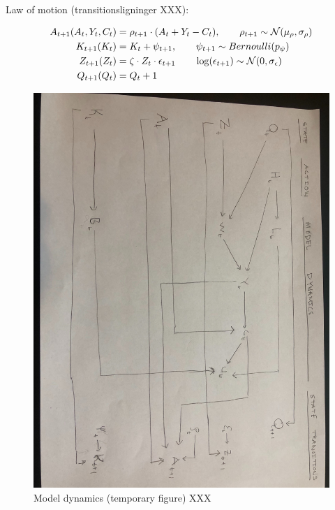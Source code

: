 Law of motion (transitionsligninger XXX):

\begin{align}
    A_{t+1}(A_t, Y_t, C_t) &= \rho_{t+1} \cdot (A_t + Y_t - C_t), \qquad \rho_{t+1} \sim \mathcal{N}(\mu_{\rho}, \sigma_{\rho}) \label{eq:assets_v1} \\
    K_{t+1} (K_t) &= K_t + \psi_{t+1}, \qquad \psi_{t+1} \sim Bernoulli(p_{\psi}) \label{eq:kids_v1}\\
    Z_{t+1} (Z_{t}) &=  \zeta \cdot Z_t \cdot \epsilon_{t+1} \qquad \log (\epsilon_{t+1} ) \sim \mathcal{N}(0, \sigma_{\epsilon}) \label{eq:wage_level_v1}\\
    Q_{t+1} (Q_t)&= Q_t + 1 \label{eq:age_v1}
\end{align}

\begin{figure}
    \centering
    \includegraphics[scale=0.09, angle=90]{figures/modeldynamic_tmp.jpg}
    \caption{Model dynamics (temporary figure) XXX}
    \label{fig:modeldynamics}
\end{figure}

